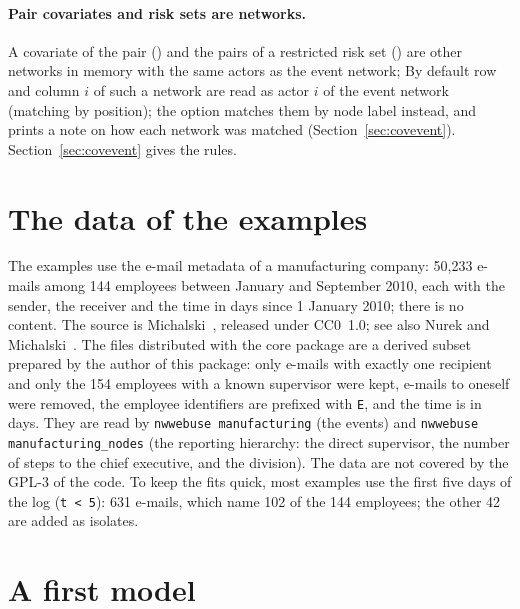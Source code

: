 \paragraph{Pair covariates and risk sets are networks.} A covariate of the pair () and the pairs of a restricted risk set () are other networks in memory with the same actors as the event network; By default row and column $i$ of such a network are read as actor $i$ of the event network (matching by position); the option  matches them by node label instead, and \nwrem{} prints a note on how each network was matched (Section~\ref{sec:covevent}). Section~\ref{sec:covevent} gives the rules.

\section{The data of the examples}\label{sec:data}

The examples use the e-mail metadata of a manufacturing company: 50,233 e-mails among 144 employees between January and September 2010, each with the sender, the receiver and the time in days since 1 January 2010; there is no content. The source is Michalski~\cite{michalski2020}, released under CC0~1.0; see also Nurek and Michalski~\cite{nurek2020}. The files distributed with the core package are a derived subset prepared by the author of this package: only e-mails with exactly one recipient and only the 154 employees with a known supervisor were kept, e-mails to oneself were removed, the employee identifiers are prefixed with \texttt{E}, and the time is in days. They are read by \texttt{nwwebuse manufacturing} (the events) and \texttt{nwwebuse manufacturing\_nodes} (the reporting hierarchy: the direct supervisor, the number of steps to the chief executive, and the division). The data are not covered by the GPL-3 of the code. To keep the fits quick, most examples use the first five days of the log (\texttt{t < 5}): 631 e-mails, which name 102 of the 144 employees; the other 42 are added as isolates.

\section{A first model}\label{sec:firstmodel}

